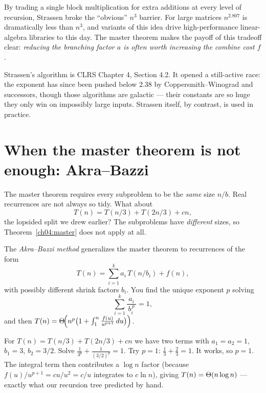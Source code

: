 \begin{aestheticbox}
By trading a single block multiplication for extra additions at every
level of recursion, Strassen broke the ``obvious'' $n^3$ barrier. For large
matrices $n^{2.807}$ is dramatically less than $n^{3}$, and variants of this idea
drive high-performance linear-algebra libraries to this day. The master theorem makes the payoff of this tradeoff clear: \emph{reducing the branching factor $a$ is often worth increasing the combine cost $f$}.
\end{aestheticbox}

\begin{connectionbox}
Strassen's algorithm is CLRS Chapter 4, Section 4.2. It opened a still-active race:
the exponent has since been pushed below $2.38$ by Coppersmith--Winograd and
successors, though those algorithms are galactic --- their constants are so huge
they only win on impossibly large inputs. Strassen itself, by contrast, is used in
practice.
\end{connectionbox}

\section{When the master theorem is not enough: Akra--Bazzi}
\label{ch04:akra}

The master theorem requires every subproblem to be the \emph{same} size $n/b$.
Real recurrences are not always so tidy. What about
\[T(n) = T(n/3) + T(2n/3) + cn,\]
the lopsided split we drew earlier? The subproblems have \emph{different} sizes,
so Theorem~\ref{ch04:master} does not apply at all.

The \emph{Akra--Bazzi method} generalizes the master theorem to recurrences of the
form
\[T(n) = \sum_{i=1}^{k} a_i\,T(n/b_i) + f(n),\]
with possibly different shrink factors $b_i$. You find the unique exponent $p$
solving
\[\sum_{i=1}^{k} \frac{a_i}{\,b_i^{\,p}\,} = 1,\]
and then $T(n) = \Theta\!\Big(n^{p}\big(1 + \int_1^{n} \frac{f(u)}{u^{p+1}}\,du\big)\Big)$.

\begin{example}
For $T(n)=T(n/3)+T(2n/3)+cn$ we have two terms with $a_1=a_2=1$, $b_1=3$,
$b_2=3/2$. Solve $\frac{1}{3^{p}} + \frac{1}{(3/2)^{p}} = 1$. Try $p=1$:
$\frac13 + \frac23 = 1$. It works, so $p=1$. The integral term then contributes a
$\log n$ factor (because $f(u)/u^{p+1} = cu/u^2 = c/u$ integrates to $c\ln n$),
giving $T(n)=\Theta(n\log n)$ --- exactly what our recursion tree predicted by hand.
\end{example}

